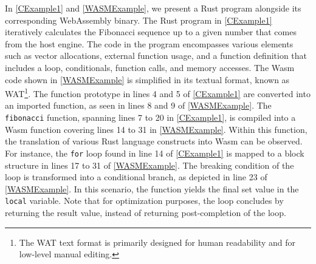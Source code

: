 In \autoref{CExample1} and \autoref{WASMExample}, we present a Rust program alongside its corresponding WebAssembly binary. 
The Rust program in \autoref{CExample1} iteratively calculates the Fibonacci sequence up to a given number that comes from the host engine.
The code in the program encompasses various elements such as vector allocations, external function usage, and a function definition that includes a loop, conditionals, function calls, and memory accesses.
The Wasm code shown in \autoref{WASMExample} is simplified in its textual format, known as WAT\footnote{The WAT text format is primarily designed for human readability and for low-level manual editing.}.
The function prototype in lines 4 and 5 of \autoref{CExample1} are converted into an imported function, as seen in lines 8 and 9 of \autoref{WASMExample}.
The \texttt{fibonacci} function, spanning lines 7 to 20 in \autoref{CExample1}, is compiled into a Wasm function covering lines 14 to 31 in \autoref{WASMExample}. Within this function, the translation of various Rust language constructs into Wasm can be observed.
For instance, the \texttt{for} loop found in line 14 of \autoref{CExample1} is mapped to a block structure in lines 17 to 31 of \autoref{WASMExample}. 
The breaking condition of the loop is transformed into a conditional branch, as depicted in line 23 of \autoref{WASMExample}. 
In this scenario, the function yields the final set value in the \texttt{local} variable. 
Note that for optimization purposes, the loop concludes by returning the result value, instead of returning post-completion of the loop.


\begin{minipage}[h]{0.9\textwidth}
    \begin{minipage}[t]{1.0\linewidth}
    
    \end{minipage}
\end{minipage}




